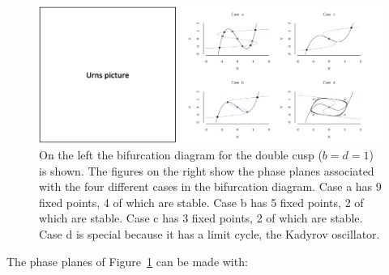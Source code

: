 \documentclass[
  a4paper,
  DIV=11,
  numbers=noendperiod,
  oneside]{scrreprt}
\begin{document}
\begin{figure}

{\centering \includegraphics{media/ch4n/fig-ch4n-img16-old-64.png}

}

\caption{\label{fig-ch4n-img16-old-64}On the left the bifurcation
diagram for the double cusp (\(b = d = 1\)) is shown. The figures on the
right show the phase planes associated with the four different cases in
the bifurcation diagram. Case a has 9 fixed points, 4 of which are
stable. Case b has 5 fixed points, 2 of which are stable. Case c has 3
fixed points, 2 of which are stable. Case d is special because it has a
limit cycle, the Kadyrov oscillator.}

\end{figure}

The phase planes of Figure~\ref{fig-ch4n-img16-old-64} can be made with:
\end{document}
